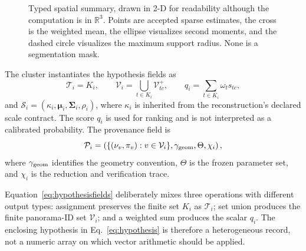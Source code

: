 \documentclass[a4paper,9pt]{extarticle}
\newcommand{\R}{\mathbb R}
\begin{document}
\begin{figure}[t]
\centering
{}
\caption{Typed spatial summary, drawn in 2-D for readability although the computation is in $\R^3$. Points are accepted sparse estimates, the cross is the weighted mean, the ellipse visualizes second moments, and the dashed circle visualizes the maximum support radius. None is a segmentation mask.}
\label{fig:clustertypes}
\end{figure}
The cluster instantiates the hypothesis fields as
\begin{equation}
 \mathcal T_i=K_i,\qquad
 \mathcal V_i=\bigcup_{t\in K_i}\mathcal V^+_{tc},\qquad
 q_i=\sum_{t\in K_i}\omega_t s_{tc},
 \label{eq:hypothesisfields}
\end{equation}
and $\mathcal S_i=(\kappa_i,\bm\mu_i,\bm\Sigma_i,\rho_i)$, where $\kappa_i$ is inherited from the reconstruction's declared scale contract. The score $q_i$ is used for ranking and is not interpreted as a calibrated probability. The provenance field is
\begin{equation}
 \mathcal P_i=\left(
  \{(\nu_v,\pi_v):v\in\mathcal V_i\},
  \gamma_{\rm geom},\Theta,\chi_i\right),
 \label{eq:provenance}
\end{equation}
where $\gamma_{\rm geom}$ identifies the geometry convention, $\Theta$ is the frozen parameter set, and $\chi_i$ is the reduction and verification trace.

Equation~\ref{eq:hypothesisfields} deliberately mixes three operations with
different output types: assignment preserves the finite set $K_i$ as
$\mathcal T_i$; set union produces the finite panorama-ID set $\mathcal V_i$;
and a weighted sum produces the scalar $q_i$. The enclosing hypothesis in
Eq.~\ref{eq:hypothesis} is therefore a heterogeneous record, not a numeric
array on which vector arithmetic should be applied.
\end{document}
